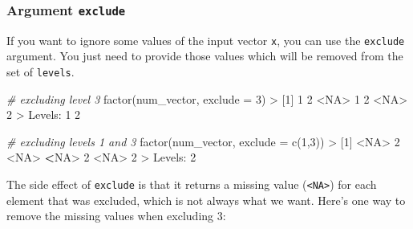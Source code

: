 \documentclass[
]{book}
\newenvironment{Shaded}{\begin{snugshade}}{\end{snugshade}}
\newcommand{\AttributeTok}[1]{\textcolor[rgb]{0.77,0.63,0.00}{#1}}
\newcommand{\CommentTok}[1]{\textcolor[rgb]{0.56,0.35,0.01}{\textit{#1}}}
\newcommand{\ConstantTok}[1]{\textcolor[rgb]{0.00,0.00,0.00}{#1}}
\newcommand{\DecValTok}[1]{\textcolor[rgb]{0.00,0.00,0.81}{#1}}
\newcommand{\ErrorTok}[1]{\textcolor[rgb]{0.64,0.00,0.00}{\textbf{#1}}}
\newcommand{\FunctionTok}[1]{\textcolor[rgb]{0.00,0.00,0.00}{#1}}
\newcommand{\NormalTok}[1]{#1}
\newcommand{\SpecialCharTok}[1]{\textcolor[rgb]{0.00,0.00,0.00}{#1}}
\begin{document}
\hypertarget{argument-exclude}{%
\subsubsection*{\texorpdfstring{Argument \texttt{exclude}}{Argument exclude}}\label{argument-exclude}}

If you want to ignore some values of the input vector \texttt{x}, you can use the
\texttt{exclude} argument. You just need to provide those values which will be removed
from the set of \texttt{levels}.

\begin{Shaded}
\begin{Highlighting}[]
\CommentTok{\# excluding level 3}
\FunctionTok{factor}\NormalTok{(num\_vector, }\AttributeTok{exclude =} \DecValTok{3}\NormalTok{)}
\SpecialCharTok{\textgreater{}}\NormalTok{ [}\DecValTok{1}\NormalTok{] }\DecValTok{1}    \DecValTok{2}    \SpecialCharTok{\textless{}}\ConstantTok{NA}\SpecialCharTok{\textgreater{}} \DecValTok{1}    \DecValTok{2}    \SpecialCharTok{\textless{}}\ConstantTok{NA}\SpecialCharTok{\textgreater{}} \DecValTok{2}   
\SpecialCharTok{\textgreater{}}\NormalTok{ Levels}\SpecialCharTok{:} \DecValTok{1} \DecValTok{2}

\CommentTok{\# excluding levels 1 and 3}
\FunctionTok{factor}\NormalTok{(num\_vector, }\AttributeTok{exclude =} \FunctionTok{c}\NormalTok{(}\DecValTok{1}\NormalTok{,}\DecValTok{3}\NormalTok{))}
\SpecialCharTok{\textgreater{}}\NormalTok{ [}\DecValTok{1}\NormalTok{] }\SpecialCharTok{\textless{}}\ConstantTok{NA}\SpecialCharTok{\textgreater{}} \DecValTok{2}    \SpecialCharTok{\textless{}}\ConstantTok{NA}\SpecialCharTok{\textgreater{}} \ErrorTok{\textless{}}\ConstantTok{NA}\SpecialCharTok{\textgreater{}} \DecValTok{2}    \SpecialCharTok{\textless{}}\ConstantTok{NA}\SpecialCharTok{\textgreater{}} \DecValTok{2}   
\SpecialCharTok{\textgreater{}}\NormalTok{ Levels}\SpecialCharTok{:} \DecValTok{2}
\end{Highlighting}
\end{Shaded}

The side effect of \texttt{exclude} is that it returns a missing value (\texttt{\textless{}NA\textgreater{}}) for
each element that was excluded, which is not always what we want. Here's one
way to remove the missing values when excluding 3:
\end{document}
